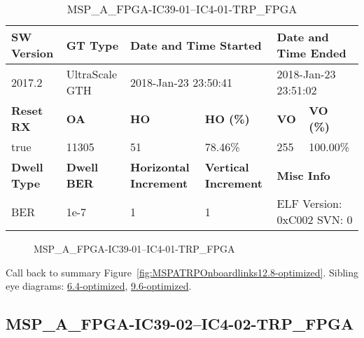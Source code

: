 \begin{table}[h]
\centering
\caption{MSP\_A\_FPGA-IC39-01--IC4-01-TRP\_FPGA}
\label{tab:MSPAFPGAIC3901IC401TRPFPGA12.8-optimized}
\begin{tabular}{@{}|l|l|l|l|l|l|@{}}
\toprule
\textbf{SW Version}                & \textbf{GT Type}   & \multicolumn{2}{l|}{\textbf{Date and Time Started}}            & \multicolumn{2}{l|}{\textbf{Date and Time Ended}}        \\ \midrule
2017.2                       & UltraScale GTH          & \multicolumn{2}{l|}{2018-Jan-23 23:50:41}                   & \multicolumn{2}{l|}{2018-Jan-23 23:51:02}               \\ \midrule
\textbf{Reset RX}                  & \textbf{OA} & \textbf{HO}   & \textbf{HO (\%)} & \textbf{VO} & \textbf{VO (\%)} \\ \midrule
true & 11305        & 51          & 78.46\%        & 255        & 100.00\%       \\ \midrule
\textbf{Dwell Type}                & \textbf{Dwell BER} & \textbf{Horizontal Increment} & \textbf{Vertical Increment}    & \multicolumn{2}{l|}{\textbf{Misc Info}}                  \\ \midrule
BER                            & 1e-7        & 1        & 1           & \multicolumn{2}{l|}{ELF Version: 0xC002 SVN: 0}                         \\ \bottomrule
\end{tabular}
\end{table}

\begin{figure}[h]
\caption{MSP\_A\_FPGA-IC39-01--IC4-01-TRP\_FPGA} \label{fig:MSPAFPGAIC3901IC401TRPFPGA12.8-optimized}
\end{figure}

Call back to summary Figure~\ref{fig:MSPATRPOnboardlinks12.8-optimized}.
Sibling eye diagrams: \hyperref[sec:MSPAFPGAIC3901IC401TRPFPGA6.4-optimized]{6.4-optimized}, \hyperref[sec:MSPAFPGAIC3901IC401TRPFPGA9.6-optimized]{9.6-optimized}.

\clearpage
\newpage


\subsection{MSP\_A\_FPGA-IC39-02--IC4-02-TRP\_FPGA}\label{sec:MSPAFPGAIC3902IC402TRPFPGA12.8-optimized}

